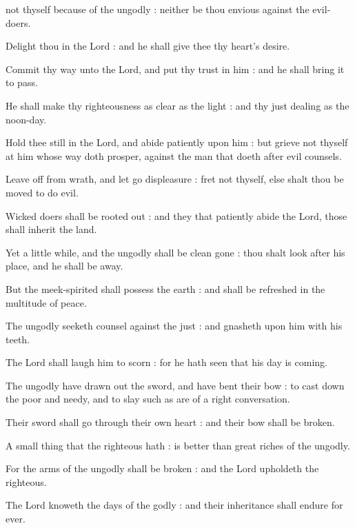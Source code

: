  not thyself because of the ungodly : neither be thou envious against the evil-doers.\par
{}
Delight thou in the Lord : and he shall give thee thy heart's desire.\par
{}Commit thy way unto the Lord, and put thy trust in him : and he shall bring it to pass.\par
{}He shall make thy righteousness as clear as the light : and thy just dealing as the noon-day.\par
{}Hold thee still in the Lord, and abide patiently upon him : but grieve not thyself at him whose way doth prosper, against the man that doeth after evil counsels.\par
{}Leave off from wrath, and let go displeasure : fret not thyself, else shalt thou be moved to do evil.\par
{}Wicked doers shall be rooted out : and they that patiently abide the Lord, those shall inherit the land.\par
{}Yet a little while, and the ungodly shall be clean gone : thou shalt look after his place, and he shall be away.\par
{}But the meek-spirited shall possess the earth : and shall be refreshed in the multitude of peace.\par
{}The ungodly seeketh counsel against the just : and gnasheth upon him with his teeth.\par
{}The Lord shall laugh him to scorn : for he hath seen that his day is coming.\par
{}The ungodly have drawn out the sword, and have bent their bow : to cast down the poor and needy, and to slay such as are of a right conversation.\par
{}Their sword shall go through their own heart : and their bow shall be broken.\par
{}A small thing that the righteous hath : is better than great riches of the ungodly.\par
{}For the arms of the ungodly shall be broken : and the Lord upholdeth the righteous.\par
{}The Lord knoweth the days of the godly : and their inheritance shall endure for ever.\par
